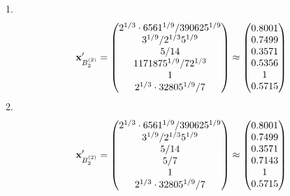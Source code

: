\documentclass[10pt,a4paper]{article}
\begin{document}
	1.
	\[
		\bold{x}'_{B_2^{(2)}} = 
		\begin{pmatrix}
			{{2^ {1 / 3}} \cdot {6561^ {1 / 9}}} / {{390625^ {1 / 9}}} \\
			{{3^ {1 / 9}}} / {{2^ {1 / 3}}{5^ {1 / 9}}} \\
			{{5}} / {{14}} \\
			{{1171875^ {1 / 9}}} / {{7}{2^ {1 / 3}}} \\
			{1}{} \\
			{{2^ {1 / 3}} \cdot {32805^ {1 / 9}}} / {{7}} \\
		\end{pmatrix}
		\approx
		\begin{pmatrix}
			0.8001   \\
			0.7499   \\
			0.3571   \\
			0.5356   \\
			1        \\
			0.5715   \\
		\end{pmatrix}
	\]
	2.
	\[
		\bold{x}'_{B_2^{(2)}} = 
		\begin{pmatrix}
			{{2^ {1 / 3}} \cdot {6561^ {1 / 9}}} / {{390625^ {1 / 9}}} \\
			{{3^ {1 / 9}}} / {{2^ {1 / 3}}{5^ {1 / 9}}} \\
			{{5}} / {{14}} \\
			{{5}} / {{7}} \\
			{1}{} \\
			{{2^ {1 / 3}} \cdot {32805^ {1 / 9}}} / {{7}} \\
		\end{pmatrix}
		\approx
		\begin{pmatrix}
			0.8001   \\
			0.7499   \\
			0.3571   \\
			0.7143   \\
			1        \\
			0.5715   \\
		\end{pmatrix}
	\]
\end{document}
